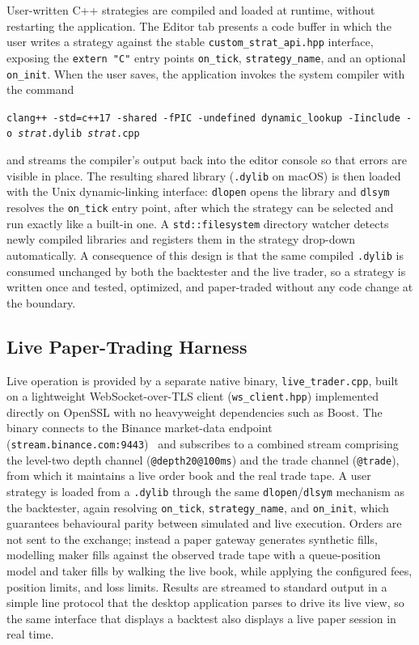 \documentclass[12pt,oneside,a4paper]{report}
\begin{document}
User-written C++ strategies are compiled and loaded at runtime, without restarting the application. The Editor tab presents a code buffer in which the user writes a strategy against the stable \texttt{custom\_strat\_api.hpp} interface, exposing the \texttt{extern "C"} entry points \texttt{on\_tick}, \texttt{strategy\_name}, and an optional \texttt{on\_init}. When the user saves, the application invokes the system compiler with the command
\begin{center}
\texttt{clang++ -std=c++17 -shared -fPIC -undefined dynamic\_lookup -Iinclude -o \textit{strat}.dylib \textit{strat}.cpp}
\end{center}
and streams the compiler's output back into the editor console so that errors are visible in place. The resulting shared library (\texttt{.dylib} on macOS) is then loaded with the Unix dynamic-linking interface: \texttt{dlopen} opens the library and \texttt{dlsym} resolves the \texttt{on\_tick} entry point, after which the strategy can be selected and run exactly like a built-in one. A \texttt{std::filesystem} directory watcher detects newly compiled libraries and registers them in the strategy drop-down automatically. A consequence of this design is that the same compiled \texttt{.dylib} is consumed unchanged by both the backtester and the live trader, so a strategy is written once and tested, optimized, and paper-traded without any code change at the boundary.

\subsection{Live Paper-Trading Harness}
\label{sec:live-module}

Live operation is provided by a separate native binary, \texttt{live\_trader.cpp}, built on a lightweight WebSocket-over-TLS client (\texttt{ws\_client.hpp}) implemented directly on OpenSSL with no heavyweight dependencies such as Boost. The binary connects to the Binance market-data endpoint (\texttt{stream.binance.com:9443})~\cite{binance} and subscribes to a combined stream comprising the level-two depth channel (\texttt{@depth20@100ms}) and the trade channel (\texttt{@trade}), from which it maintains a live order book and the real trade tape. A user strategy is loaded from a \texttt{.dylib} through the same \texttt{dlopen}/\texttt{dlsym} mechanism as the backtester, again resolving \texttt{on\_tick}, \texttt{strategy\_name}, and \texttt{on\_init}, which guarantees behavioural parity between simulated and live execution. Orders are not sent to the exchange; instead a paper gateway generates synthetic fills, modelling maker fills against the observed trade tape with a queue-position model and taker fills by walking the live book, while applying the configured fees, position limits, and loss limits. Results are streamed to standard output in a simple line protocol that the desktop application parses to drive its live view, so the same interface that displays a backtest also displays a live paper session in real time.
\end{document}
